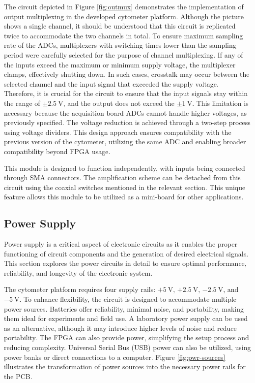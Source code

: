 The circuit depicted in Figure \ref{fig:outmux} demonstrates the implementation of output multiplexing in the developed cytometer platform. Although the picture shows a single channel, it should be understood that this circuit is replicated twice to accommodate the two channels in total. To ensure maximum sampling rate of the ADCs, multiplexers with switching times lower than the sampling period were carefully selected for the purpose of channel multiplexing. If any of the inputs exceed the maximum or minimum supply voltage, the multiplexer clamps, effectively shutting down. In such cases, crosstalk may occur between the selected channel and the input signal that exceeded the supply voltage. Therefore, it is crucial for the circuit to ensure that the input signals stay within the range of $\mathrm{\pm2.5~V}$, and the output does not exceed the $\mathrm{\pm1~V}$. This limitation is necessary because the acquisition board ADCs cannot handle higher voltages, as previously specified. The voltage reduction is achieved through a two-step process using voltage dividers. This design approach ensures compatibility with the previous version of the cytometer, utilizing the same ADC and enabling broader compatibility beyond FPGA usage.

This module is designed to function independently, with inputs being connected through
SMA connectors. The amplification scheme can be detached from this circuit using the coaxial switches mentioned in the relevant section. This unique feature allows this module to be utilized as a mini-board for other applications.

\subsection{Power Supply}

Power supply is a critical aspect of electronic circuits as it enables the proper functioning of circuit components and the generation of desired electrical signals. This section explores the power circuits in detail to ensure optimal performance, reliability, and longevity of the electronic system.

The cytometer platform requires four supply rails: $\mathrm{+5~V}$, $\mathrm{+2.5~V}$, $\mathrm{-2.5~V}$, and $\mathrm{-5~V}$. To enhance flexibility, the circuit is designed to accommodate multiple power sources. Batteries offer reliability, minimal noise, and portability, making them ideal for experiments and field use. A laboratory power supply can be used as an alternative, although it may introduce higher levels of noise and reduce portability. The FPGA can also provide power, simplifying the setup process and reducing complexity. Universal Serial Bus (USB) power can also be utilized, using power banks or direct connections to a computer. Figure \ref{fig:pwr-sources} illustrates the transformation of power sources into the necessary power rails for the PCB.

